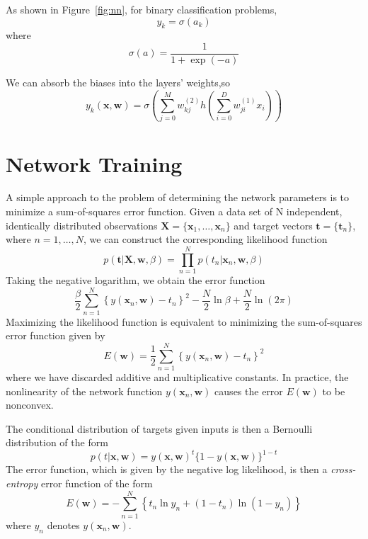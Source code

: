 \documentclass[5p,sort&compress]{elsarticle}
\begin{document}
As shown in Figure~\ref{fig:nn}, for binary classification problems, 
\begin{equation}
    y_k = \sigma(a_k)
\end{equation}
where 
\begin{equation}
\sigma(a)=\frac{1}{1+\exp (-a)}
\end{equation}

We can absorb the biases into the layers' weights,so
\begin{equation}
y_{k}(\mathbf{x}, \mathbf{w})=\sigma\left(\sum_{j=0}^{M} w_{k j}^{(2)} h\left(\sum_{i=0}^{D} w_{j i}^{(1)} x_{i}\right)\right)
\end{equation}


\section{Network Training}

A simple approach to the problem of determining the network parameters is to minimize a sum-of-squares error function. 
Given a data set of N independent, identically distributed observations $\mathbf{X} = \{\mathbf{x}_1, \ldots, \mathbf{x}_n\}$ and target vectors $\mathbf{t} = \{\mathbf{t}_n\}$, where $n = 1, \ldots, N$, we can construct the corresponding likelihood function
\begin{equation}
p(\mathbf{t} | \mathbf{X}, \mathbf{w}, \beta)=\prod_{n=1}^{N} p\left(t_{n} | \mathbf{x}_{n}, \mathbf{w}, \beta\right)
\end{equation}
Taking the negative logarithm, we obtain the error function
\begin{equation}
\frac{\beta}{2} \sum_{n=1}^{N}\left\{y\left(\mathbf{x}_{n}, \mathbf{w}\right)-t_{n}\right\}^{2}-\frac{N}{2} \ln \beta+\frac{N}{2} \ln (2 \pi)
\end{equation}
Maximizing the likelihood function is equivalent to minimizing the sum-of-squares error function given by
\begin{equation}
E(\mathbf{w})=\frac{1}{2} \sum_{n=1}^{N}\left\{y\left(\mathbf{x}_{n}, \mathbf{w}\right)-t_{n}\right\}^{2}
\end{equation}
where we have discarded additive and multiplicative constants. In practice, the nonlinearity of the network function $y(\mathbf{x}_n, \mathbf{w})$ causes the error $E(\mathbf{w})$ to be nonconvex.

The conditional distribution of targets given inputs is then a Bernoulli distribution of the form
\begin{equation}
p(t | \mathbf{x}, \mathbf{w})=y(\mathbf{x}, \mathbf{w})^{t}\{1-y(\mathbf{x}, \mathbf{w})\}^{1-t}
\end{equation}
The error function, which is given by the negative log likelihood, is then a \textit{cross-entropy} error function
of the form
\begin{equation}
E(\mathbf{w})=-\sum_{n=1}^{N}\left\{t_{n} \ln y_{n}+\left(1-t_{n}\right) \ln \left(1-y_{n}\right)\right\}
\end{equation}
where $y_n$ denotes $y(\mathbf{x}_n, \mathbf{w})$.
\end{document}
